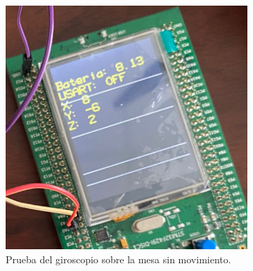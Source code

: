     \begin{figure}[H]
        \begin{subfigure}{0.5\textwidth}
        \centering
        \includegraphics[width=\textwidth]{Imagenes/giroscopio2.png} 
        \caption{Prueba del giroscopio sobre la mesa sin movimiento.}
        \label{Fig:giroscopio}
    \end{subfigure}
    \begin{subfigure}{0.5\textwidth}
        \centering

\end{subfigure}
\end{figure}

